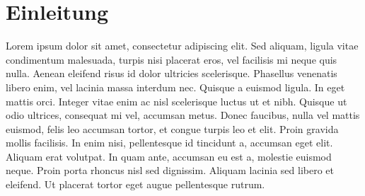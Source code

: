 \section{Einleitung}

Lorem ipsum dolor sit amet, consectetur adipiscing elit. Sed aliquam, ligula vitae condimentum malesuada, turpis nisi placerat eros, vel facilisis mi neque quis nulla. Aenean eleifend risus id dolor ultricies scelerisque. Phasellus venenatis libero enim, vel lacinia massa interdum nec. Quisque a euismod ligula. In eget mattis orci. Integer vitae enim ac nisl scelerisque luctus ut et nibh. Quisque ut odio ultrices, consequat mi vel, accumsan metus. Donec faucibus, nulla vel mattis euismod, felis leo accumsan tortor, et congue turpis leo et elit. Proin gravida mollis facilisis. In enim nisi, pellentesque id tincidunt a, accumsan eget elit. Aliquam erat volutpat. In quam ante, accumsan eu est a, molestie euismod neque. Proin porta rhoncus nisl sed dignissim. Aliquam lacinia sed libero et eleifend. Ut placerat tortor eget augue pellentesque rutrum.